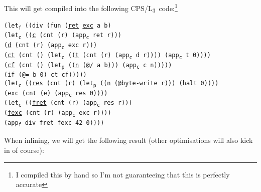 \documentclass[12pt,a4paper]{article}
\newcommand{\lang}{L\textsubscript{3}~}
\newcommand{\cps}[3]{\texttt{\textcolor{BurntOrange}{#1}#2\textcolor{BurntOrange}{#3}}}
\newcommand{\ts}[2]{#1\textsubscript{#2}}
\newcommand{\letp}{\ts{let}{p}}
\newcommand{\letc}{\ts{let}{c}}
\newcommand{\letf}{\ts{let}{f}}
\newcommand{\appc}{\ts{app}{c}}
\newcommand{\appf}{\ts{app}{f}}
\begin{document}
This will get compiled into the following CPS/\lang code:\footnote{I compiled this by hand so I'm not guaranteeing that this is perfectly accurate}

\cps{(\letf~}{\cps{(}{(div \cps{(fun }{(\underline{ret} \underline{exc} a b)\\
\hspace*{8em}\cps{(\letc~}{\cps{(}{(\underline{c} \cps{(cnt }{(r) \cps{(\appc~}{ret r}{)}}{)})\\
\hspace*{11.4em}(\underline{d} \cps{(cnt }{(r) \cps{(\appc~}{exc r}{)}}{)})\\
\hspace*{11.4em}(\underline{ct} \cps{(cnt }{() \cps{(\letc~}{\cps{(}{(\underline{t} \cps{(cnt }{(r) \cps{(\appc~}{d r}{)}}{)})}{)} \cps{(\appc~}{t 0}{)}}{)}}{)})\\
\hspace*{11.4em}(\underline{cf} \cps{(cnt }{() \cps{(\letp~}{\cps{(}{(\underline{n} \cps{(@}{/ a b}{)})}{)} \cps{(\appc~}{c n}{)}}{)}}{)})}{)}\\
\hspace*{10em}\cps{(if (@}{= b 0}{) ct cf)}}{)}}{)})}{)}\\
\hspace*{3em}\cps{(\letc~}{\cps{(}{(\underline{res} \cps{(cnt }{(r) \cps{(\letp~}{\cps{(}{(\underline{n} \cps{(@}{byte-write r}{)})}{)} \cps{(halt }{0}{)}}{)}}{)})\\
\hspace*{6.4em}(\underline{exc} \cps{(cnt }{(e) \cps{(\appc~}{res 0}{)}}{)})}{)}\\
\hspace*{5em}\cps{(\letc~}{\cps{(}{(\underline{fret} \cps{(cnt }{(r) \cps{(\appc~}{res r}{)}}{)})\\
\hspace*{8.4em}(\underline{fexc} \cps{(cnt }{(r) \cps{(\appc~}{exc r}{)}}{)})}{)}\\
\hspace*{7em}\cps{(\appf~}{div fret fexc 42 0}{)}}{)}}{)}}{)}

When inlining, we will get the following result (other optimisations will also kick in of course):
\end{document}
